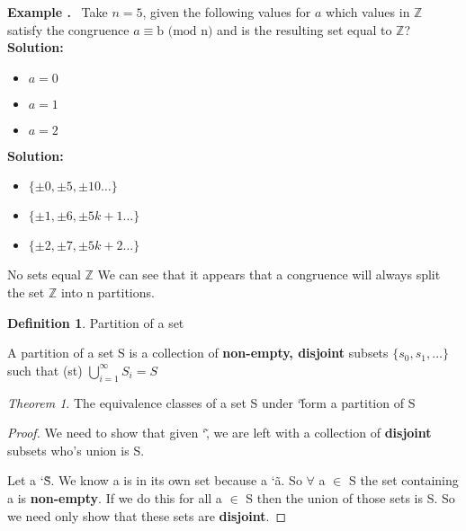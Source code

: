 \documentclass{article}
\newcounter{example}
\newcounter{solution}
\theoremstyle{definition}
\newtheorem{definition}{Definition}[section]
\theoremstyle{claim}
\theoremstyle{remark}
\theoremstyle{theorem}
\newtheorem{theorem}{Theorem}
\newcommand\Example{%
  \stepcounter{example}%
  \textbf{Example \theexample.}~%
  \setcounter{solution}{0}%
}
\newcommand\TheSolution{%
  \textbf{Solution:}\\%
}
\begin{document}
\begin{flushleft}
\newline
\newline
\Example Take $n = 5$, given the following values for $a$ which values in $\mathbb{Z}$ satisfy the congruence $a \equiv \text{b (mod n)}$ and is the resulting set equal to $\mathbb{Z}$?
\TheSolution 
\begin{itemize}
     \item $a = 0$
     \item $a = 1$
     \item $a = 2$
\end{itemize}
\TheSolution 
\begin{itemize}
     \item $\{\pm{0}, \pm{5}, \pm{10}\dots\}$
     \item $\{\pm{1}, \pm{6}, \pm{5k+1}\dots\}$
     \item $\{\pm{2}, \pm{7}, \pm{5k+2}\dots\}$
\end{itemize}
No sets equal $\mathbb{Z}$
\newline
\newline
We can see that it appears that a congruence will always split the set $\mathbb{Z}$ into n partitions.
\newline
\begin{definition}{Partition of a set}

A partition of a set S is a collection of \textbf{non-empty, disjoint} subsets $\{s_{0}, s_{1}, \dots\}$ such that (st) $\bigcup\limits_{i=1}^{\infty} S_{i} = S$

\end{definition}
\begin{theorem}{The equivalence classes of a set S under \char`\~ form a partition of S}
\end{theorem}
\begin{proof}{}
We need to show that given \char`\~, we are left with a collection of \textbf{disjoint} subsets who's union is S.

Let a \char`\~ S. We know a is in  its own set because a \char`\~ a. So $\forall$ a $\in$ S the set containing a is \textbf{non-empty}. If we do this for all a $\in$ S then the union of those sets is S. So we need only show that these sets are \textbf{disjoint}.
\end{proof}


\end{flushleft}
\end{document}
